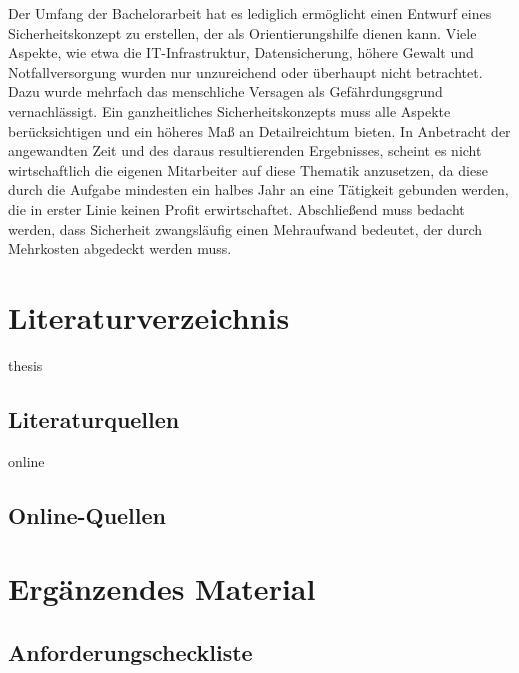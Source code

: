 \documentclass[11pt,a4paper]{report}
\begin{document}
Der Umfang der Bachelorarbeit hat es lediglich ermöglicht einen Entwurf eines Sicherheitskonzept zu erstellen, der als Orientierungshilfe dienen kann. Viele Aspekte, wie etwa die IT-Infrastruktur, Datensicherung, höhere Gewalt und Notfallversorgung wurden nur unzureichend oder überhaupt nicht betrachtet. Dazu wurde mehrfach das menschliche Versagen als Gefährdungsgrund vernachlässigt. Ein ganzheitliches Sicherheitskonzepts muss alle Aspekte berücksichtigen und ein höheres Maß an Detailreichtum bieten. In Anbetracht der angewandten Zeit und des daraus resultierenden Ergebnisses, scheint es nicht wirtschaftlich die eigenen Mitarbeiter auf diese Thematik anzusetzen, da diese durch die Aufgabe mindesten ein halbes Jahr an eine Tätigkeit gebunden werden, die in erster Linie keinen Profit erwirtschaftet. Abschließend muss bedacht werden, dass Sicherheit zwangsläufig einen Mehraufwand bedeutet, der durch Mehrkosten abgedeckt werden muss.

\newpage


\chapter{Literaturverzeichnis}
\begin{btSect}{thesis} %
\section*{Literaturquellen}
\btPrintCited
\end{btSect}
\begin{btSect}{online}
\section*{Online-Quellen}
\btPrintCited
\end{btSect}

\appendix

\chapter{Ergänzendes Material}

\section{Anforderungscheckliste}
\end{document}
